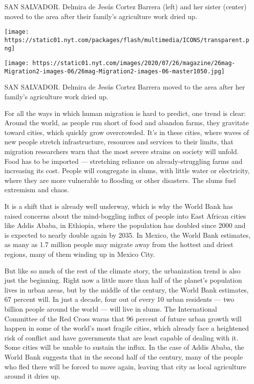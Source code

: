 SAN SALVADOR. Delmira de Jesús Cortez Barrera (left) and her sister
(center) moved to the area after their family's agriculture work dried
up.

\texttt{[image: https://static01.nyt.com/packages/flash/multimedia/ICONS/transparent.png]}

\texttt{[image: https://static01.nyt.com/images/2020/07/26/magazine/26mag-Migration2-images-06/26mag-Migration2-images-06-master1050.jpg]}

SAN SALVADOR. Delmira de Jesús Cortez Barrera moved to the area after
her family's agriculture work dried up.

For all the ways in which human migration is hard to predict, one trend
is clear: Around the world, as people run short of food and abandon
farms, they gravitate toward cities, which quickly grow overcrowded.
It's in these cities, where waves of new people stretch infrastructure,
resources and services to their limits, that migration researchers warn
that the most severe strains on society will unfold. Food has to be
imported --- stretching reliance on already-struggling farms and
increasing its cost. People will congregate in slums, with little water
or electricity, where they are more vulnerable to flooding or other
disasters. The slums fuel extremism and chaos.

It is a shift that is already well underway, which is why the World Bank
has raised concerns about the mind-boggling influx of people into East
African cities like Addis Ababa, in Ethiopia, where the population has
doubled since 2000 and is expected to nearly double again by 2035. In
Mexico, the World Bank estimates, as many as 1.7 million people may
migrate away from the hottest and driest regions, many of them winding
up in Mexico City.

But like so much of the rest of the climate story, the urbanization
trend is also just the beginning. Right now a little more than half of
the planet's population lives in urban areas, but by the middle of the
century, the World Bank estimates, 67 percent will. In just a decade,
four out of every 10 urban residents --- two billion people around the
world --- will live in slums. The International Committee of the Red
Cross warns that 96 percent of future urban growth will happen in some
of the world's most fragile cities, which already face a heightened risk
of conflict and have governments that are least capable of dealing with
it. Some cities will be unable to sustain the influx. In the case of
Addis Ababa, the World Bank suggests that in the second half of the
century, many of the people who fled there will be forced to move again,
leaving that city as local agriculture around it dries up.

